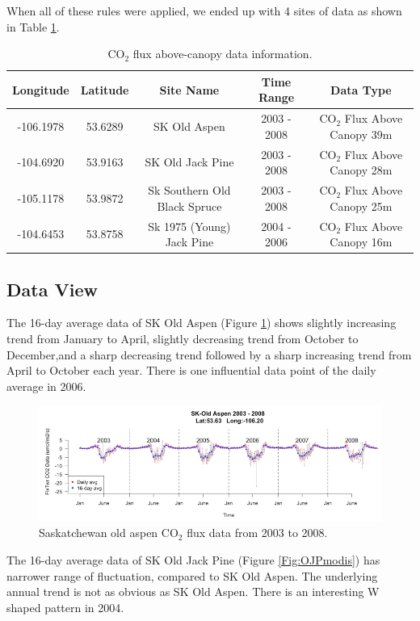 \documentclass{article}
\begin{document}
When all of these rules were applied, we ended up with 4 sites of data as shown in Table \ref{Tab:FluxData}.

\begin{table}[!ht]
\caption{CO$_2$ flux above-canopy data information.}\label{Tab:FluxData}
\centering
\begin{tabular}{ccccc}
\hline
\textbf{Longitude} & \textbf{Latitude} & \textbf{Site Name} & \textbf{Time Range} & \textbf{Data Type}\\
\hline
-106.1978 & 53.6289 & SK Old Aspen & 2003 - 2008 & CO$_2$ Flux Above Canopy 39m\\
-104.6920 & 53.9163 & SK Old Jack Pine & 2003 - 2008 & CO$_2$ Flux Above Canopy 28m\\
-105.1178 & 53.9872 & Sk Southern Old Black Spruce & 2003 - 2008 & CO$_2$ Flux Above Canopy 25m\\
-104.6453 & 53.8758 & Sk 1975 (Young) Jack Pine & 2004 - 2006 & CO$_2$ Flux Above Canopy 16m\\
\hline
\end{tabular}
\end{table}

\subsection{Data View}

The 16-day average data of SK Old Aspen (Figure \ref{Fig:OAPmodis}) shows slightly increasing trend from January to April, slightly decreasing trend from October to December,and a sharp decreasing trend followed by a sharp increasing trend from April to October each year. There is one influential data point of the daily average in 2006.

\begin{figure}[!ht]
\centering
\includegraphics[width=14cm]{OAPmodis1.png}
\caption{Saskatchewan old aspen CO$_2$ flux data from 2003 to 2008.}
\label{Fig:OAPmodis}
\end{figure}

The 16-day average data of SK Old Jack Pine (Figure \ref{Fig:OJPmodis}) has narrower range of fluctuation, compared to SK Old Aspen. The underlying annual trend is not as obvious as SK Old Aspen. There is an interesting W shaped pattern in 2004.
\end{document}
